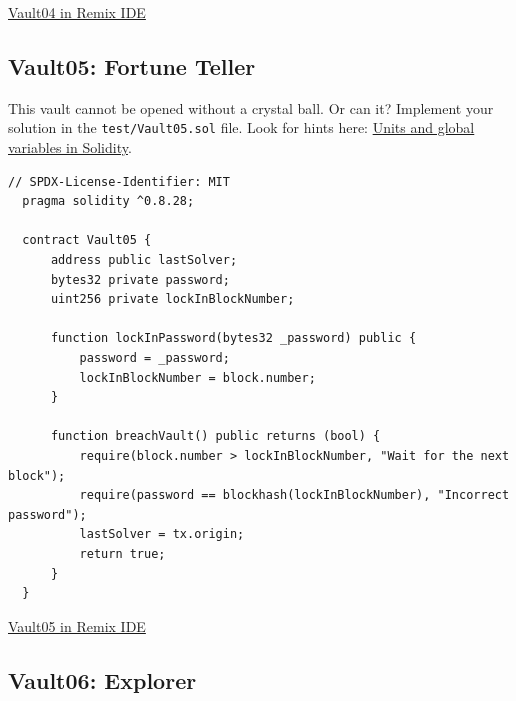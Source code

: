 \documentclass[12pt]{article}
\begin{document}
\medskip
\noindent
\href{https://remix.ethereum.org/?#activate=solidity&url=https://github.com/radovluk/unbreakable-vault/contracts/Vault04.sol&lang=en&optimize=false&runs=200&evmVersion=null&version=soljson-v0.8.28+commit.7893614a.js}{Vault04 in Remix IDE}

\subsection*{Vault05: Fortune Teller}

This vault cannot be opened without a crystal ball. Or can it? Implement your solution in the \texttt{test/Vault05.sol} file. Look for hints here: \href{https://docs.soliditylang.org/en/latest/units-and-global-variables.html}{Units and global variables in Solidity}.

\begin{lstlisting}[language=Solidity]
  // SPDX-License-Identifier: MIT
  pragma solidity ^0.8.28;
  
  contract Vault05 {
      address public lastSolver;
      bytes32 private password;
      uint256 private lockInBlockNumber;
  
      function lockInPassword(bytes32 _password) public {
          password = _password;
          lockInBlockNumber = block.number;
      }
  
      function breachVault() public returns (bool) {
          require(block.number > lockInBlockNumber, "Wait for the next block");
          require(password == blockhash(lockInBlockNumber), "Incorrect password");
          lastSolver = tx.origin;
          return true;
      }
  }
\end{lstlisting}

\medskip
\noindent
\href{https://remix.ethereum.org/?#activate=solidity&url=https://github.com/radovluk/unbreakable-vault/contracts/Vault05.sol&lang=en&optimize=false&runs=200&evmVersion=null&version=soljson-v0.8.28+commit.7893614a.js}{Vault05 in Remix IDE}

\subsection*{Vault06: Explorer}
\end{document}
